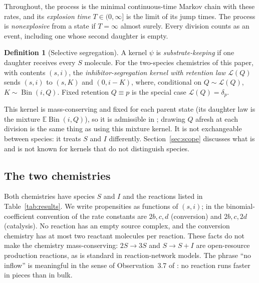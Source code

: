 \documentclass[11pt,a4paper]{article}
\numberwithin{equation}{section}
\theoremstyle{definition}\newtheorem{definition}[theorem]{Definition}
\theoremstyle{remark}\newtheorem{remark}[theorem]{Remark}\newtheorem{example}[theorem]{Example}
\newcommand{\E}{\mathbb E}
\newcommand{\Bin}{\operatorname{Bin}}
\begin{document}
Throughout, the process is the minimal continuous-time Markov chain with these rates, and its \emph{explosion time} $T\in(0,\infty]$ is the limit of its jump times. The process is \emph{nonexplosive} from a state if $T=\infty$ almost surely. Every division counts as an event, including one whose second daughter is empty.

\begin{definition}[Selective segregation]\label{def:selective}
A kernel $\psi$ is \emph{substrate-keeping} if one daughter receives every $S$ molecule. For the two-species chemistries of this paper, with contents $(s,i)$, the \emph{inhibitor-segregation kernel with retention law $\mathcal L(Q)$} sends $(s,i)$ to $(s,K)$ and $(0,i-K)$, where, conditional on $Q\sim\mathcal L(Q)$, $K\sim\Bin(i,Q)$. Fixed retention $Q\equiv p$ is the special case $\mathcal L(Q)=\delta_p$.
\end{definition}

This kernel is mass-conserving and fixed for each parent state (its daughter law is the mixture $\E\Bin(i,Q)$), so it is admissible in \cite{AHRLL2026}; drawing $Q$ afresh at each division is the same thing as using this mixture kernel. It is not exchangeable between species: it treats $S$ and $I$ differently. Section~\ref{sec:scope} discusses what is and is not known for kernels that do not distinguish species.

\subsection{The two chemistries}
Both chemistries have species $S$ and $I$ and the reactions listed in Table~\ref{tab:results}. We write propensities as functions of $(s,i)$; in the binomial-coefficient convention of \cite{AHRLL2026} the rate constants are $2b,c,d$ (conversion) and $2b,c,2d$ (catalysis). No reaction has an empty source complex, and the conversion chemistry has at most two reactant molecules per reaction. These facts do not make the chemistry mass-conserving: $2S\to3S$ and $S\to S+I$ are open-resource production reactions, as is standard in reaction-network models. The phrase ``no inflow'' is meaningful in the sense of Observation~3.7 of \cite{AHRLL2026}: no reaction runs faster in pieces than in bulk.
\end{document}
